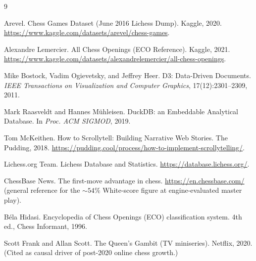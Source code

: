 \documentclass[sigconf,nonacm,natbib=false]{acmart}
\begin{document}
\begin{thebibliography}{9}

Arevel.
\newblock Chess Games Dataset (June 2016 Lichess Dump).
\newblock Kaggle, 2020.
\newblock \url{https://www.kaggle.com/datasets/arevel/chess-games}.

Alexandre Lemercier.
\newblock All Chess Openings (ECO Reference).
\newblock Kaggle, 2021.
\newblock \url{https://www.kaggle.com/datasets/alexandrelemercier/all-chess-openings}.

Mike Bostock, Vadim Ogievetsky, and Jeffrey Heer.
\newblock D3: Data-Driven Documents.
\newblock \emph{IEEE Transactions on Visualization and Computer
Graphics}, 17(12):2301--2309, 2011.

Mark Raasveldt and Hannes M\"uhleisen.
\newblock DuckDB: an Embeddable Analytical Database.
\newblock In \emph{Proc. ACM SIGMOD}, 2019.

Tom McKeithen.
\newblock How to Scrollytell: Building Narrative Web Stories.
\newblock The Pudding, 2018.
\newblock \url{https://pudding.cool/process/how-to-implement-scrollytelling/}.

Lichess.org Team.
\newblock Lichess Database and Statistics.
\newblock \url{https://database.lichess.org/}.

ChessBase News.
\newblock The first-move advantage in chess.
\newblock \url{https://en.chessbase.com/} (general reference for the
$\sim 54\%$ White-score figure at engine-evaluated master play).

B\'ela Hidasi.
\newblock Encyclopedia of Chess Openings (ECO) classification system.
\newblock 4th ed., Chess Informant, 1996.

Scott Frank and Allan Scott.
\newblock The Queen's Gambit (TV miniseries).
\newblock Netflix, 2020.
\newblock (Cited as causal driver of post-2020 online chess growth.)

\end{thebibliography}
\end{document}
